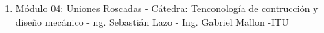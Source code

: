 \begin{enumerate}
    \item Módulo 04: Uniones Roscadas - Cátedra: Tenconología de contrucción y diseño mecánico - ng. Sebastián Lazo - Ing. Gabriel Mallon -ITU
\end{enumerate}
